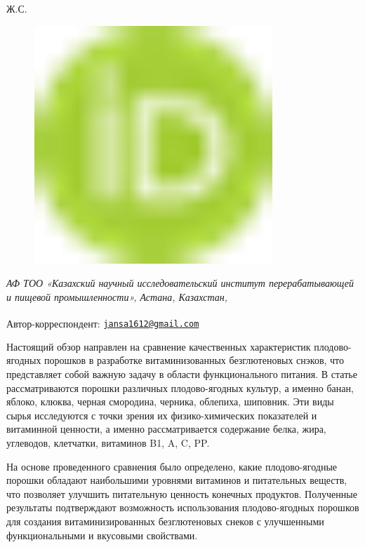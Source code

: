 {Ж.С.
\begin{figure}[H]
	\centering
	\includegraphics[width=0.8\textwidth]{media/pish2/image1}
	\caption*{}
\end{figure}


\emph{АФ ТОО «Казахский научный исследовательский институт
перерабатывающей и пищевой промышленности», Астана, Казахстан,}

{\bfseries \textsuperscript{\envelope }}Автор-корреспондент:
\href{mailto:jansa1612@gmail.com}{\nolinkurl{jansa1612@gmail.com}}

Настоящий обзор направлен на сравнение качественных характеристик
плодово-ягодных порошков в разработке витаминизованных безглютеновых
снэков, что представляет собой важную задачу в области функционального
питания. В статье рассматриваются порошки различных плодово-ягодных
культур, а именно банан, яблоко, клюква, черная смородина, черника,
облепиха, шиповник. Эти виды сырья исследуются с точки зрения их
физико-химических показателей и витаминной ценности, а именно
рассматривается содержание белка, жира, углеводов, клетчатки, витаминов
B1, A, C, PP.

На основе проведенного сравнения было определено, какие плодово-ягодные
порошки обладают наибольшими уровнями витаминов и питательных веществ,
что позволяет улучшить питательную ценность конечных продуктов.
Полученные результаты подтверждают возможность использования
плодово-ягодных порошков для создания витаминизированных безглютеновых
снеков с улучшенными функциональными и вкусовыми свойствами.

}
